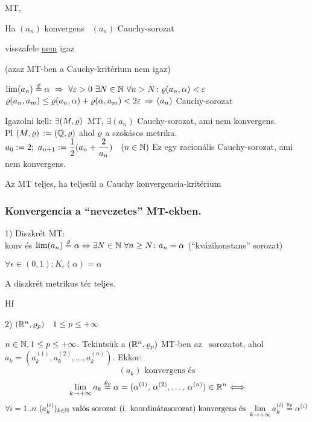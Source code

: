 \begin{te}
  \MT MT, \sorozat
  \begin{korlista}
  \item Ha $(a_n)$ konvergens \nn\ $(a_n)$ Cauchy-sorozat
  \item visszafele \underline{nem} igaz
  \end{korlista}
  (azaz  MT-ben a Cauchy-kritérium nem igaz)
\end{te}

\begin{Biz}
\item $\lim(a_n)\stackrel{\varrho}{=}\alpha\ \Rightarrow \ \forall \varepsilon >0 \ \exists
  N\in\mathbb{N}\ \forall n>N\colon \varrho(a_n,\alpha)<\varepsilon$\\
  $\varrho(a_n,a_m)\leq\varrho(a_n,\alpha) +
  \varrho(\alpha,a_m)<2\varepsilon\,\Rightarrow\,(a_n)$ Cauchy-sorozat
\item Igazolni kell: $\exists (M,\varrho)\,$ MT, $\exists (a_n)$ Cauchy-sorozat,
  ami nem konvergens.\\
  Pl $(M,\varrho)\, := (\mathbb{Q},\varrho)$ ahol $\varrho$ a szokásos metrika.\\
  $a_0 := 2;\ a_{n+1}:= \dfrac12(a_n+\dfrac2{a_n})\quad(n\in\mathbb{N})$
  Ez egy racionális
  Cauchy-sorozat, ami nem konvergens.
\end{Biz}
\begin{de}[Teljesség]
  Az \MT MT teljes, ha teljesül  a Cauchy konvergencia-kritérium
\end{de}

\subsubsection{Konvergencia a ``nevezetes'' MT-ekben.}

1) Diszkrét MT: \MT\\
\sorozat konv és $\lim(a_n)\stackrel{\varrho}{=}\alpha \Leftrightarrow \exists
N\in\mathbb{N} \ \forall n\geq N\colon a_n=\alpha $ (``kvázikonstans''
sorozat)

\begin{biz}
  $\forall \epsilon \in (0,1)\colon K_\epsilon(\alpha)={\alpha}$
\end{biz}

\begin{te}
  A diszkrét metrikus tér teljes.
\end{te}
\begin{biz}Hf
\end{biz}


2) $(\mathbb{R}^n,\varrho_p)\quad 1\leq p\leq+\infty$

\begin{te}
  $n\in\mathbb{N},1\leq p\leq+\infty$. Tekintsük a $(\mathbb{R}^n,\varrho_p)$ MT-ben az
  \ sorozatot, ahol
  $a_k=(a_k^{(1)},a_k^{(2)},\ldots,a_k^{(n)})$. Ekkor:
  \[(a_k) \text{ konvergens és}\]
  \[\displaystyle\lim_{k\to+\infty}a_k\stackrel{\varrho_p}{=}\alpha =
  (\alpha^{(1)},\,\alpha^{(2)},\ldots,\,\alpha^{(n)})\in\mathbb{R}^n
  \Longleftrightarrow\]
  \[\forall i=1..n\ (a_k^{(i)})_{k\in\mathbb{N}}
  \text{ valós sorozat (i. koordinátasorozat) konvergens és
  } \lim_{k\to+\infty}a_k^{(i)}\stackrel{\varrho_p}{=}\alpha^{(i)}\]
\end{te}

